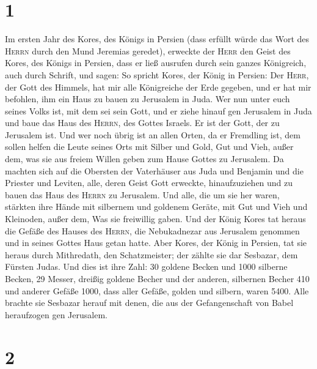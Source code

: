\hypertarget{section}{%
\section{1}\label{section}}

 Im ersten Jahr des Kores, des Königs in Persien (dass
erfüllt würde das Wort des \textsc{Herrn} durch den Mund Jeremias
geredet), erweckte der \textsc{Herr} den Geist des Kores, des Königs in
Persien, dass er ließ ausrufen durch sein ganzes Königreich, auch durch
Schrift, und sagen:  So spricht Kores, der König in
Persien: Der \textsc{Herr}, der Gott des Himmels, hat mir alle
Königreiche der Erde gegeben, und er hat mir befohlen, ihm ein Haus zu
bauen zu Jerusalem in Juda.  Wer nun unter euch seines
Volks ist, mit dem sei sein Gott, und er ziehe hinauf gen Jerusalem in
Juda und baue das Haus des \textsc{Herrn}, des Gottes Israels. Er ist
der Gott, der zu Jerusalem ist.  Und wer noch übrig ist an
allen Orten, da er Fremdling ist, dem sollen helfen die Leute seines
Orts mit Silber und Gold, Gut und Vieh, außer dem, was sie aus freiem
Willen geben zum Hause Gottes zu Jerusalem.  Da machten
sich auf die Obersten der Vaterhäuser aus Juda und Benjamin und die
Priester und Leviten, alle, deren Geist Gott erweckte, hinaufzuziehen
und zu bauen das Haus des \textsc{Herrn} zu Jerusalem. 
Und alle, die um sie her waren, stärkten ihre Hände mit silbernem und
goldenem Geräte, mit Gut und Vieh und Kleinoden, außer dem, Was sie
freiwillig gaben.  Und der König Kores tat heraus die
Gefäße des Hauses des \textsc{Herrn}, die Nebukadnezar aus Jerusalem
genommen und in seines Gottes Haus getan hatte.  Aber
Kores, der König in Persien, tat sie heraus durch Mithredath, den
Schatzmeister; der zählte sie dar Sesbazar, dem Fürsten Judas.
 Und dies ist ihre Zahl: 30 goldene Becken und 1000
silberne Becken, 29 Messer,  dreißig goldene Becher und
der anderen, silbernen Becher 410 und anderer Gefäße 1000,
 dass aller Gefäße, golden und silbern, waren 5400. Alle
brachte sie Sesbazar herauf mit denen, die aus der Gefangenschaft von
Babel heraufzogen gen Jerusalem.

\hypertarget{section-1}{%
\section{2}\label{section-1}}

